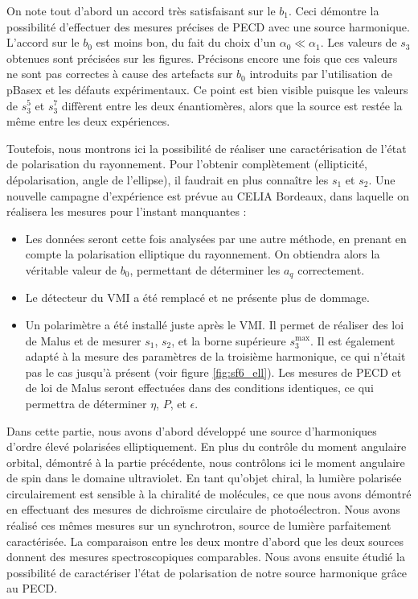 On note tout d'abord un accord très satisfaisant sur le $b_1$. Ceci démontre la possibilité d'effectuer des mesures précises de PECD avec une source harmonique. L'accord sur le $b_0$ est moins bon, du fait du choix d'un $\alpha_0\ll\alpha_1$. Les valeurs de $s_3$ obtenues sont précisées sur les figures. Précisons encore une fois que ces valeurs ne sont pas correctes à cause des artefacts sur $b_0$ introduits par l'utilisation de pBasex et les défauts expérimentaux. Ce point est bien visible puisque les valeurs de $s_3^5$ et $s_3^7$ diffèrent entre les deux énantiomères, alors que la source est restée la même entre les deux expériences.\par
Toutefois, nous montrons ici la possibilité de réaliser une caractérisation de l'état de polarisation du rayonnement. Pour l'obtenir complètement (ellipticité, dépolarisation, angle de l'ellipse), il faudrait en plus connaître les $s_1$ et $s_2$. Une nouvelle campagne d'expérience est prévue au CELIA Bordeaux, dans laquelle on réalisera les mesures pour l'instant manquantes :


\begin{itemize}
\renewcommand{\labelitemi}{$\bullet$}
\setlength\itemsep{1em}
\item Les données seront cette fois analysées par une autre méthode, en prenant en compte la polarisation elliptique du rayonnement. On obtiendra alors la véritable valeur de $b_0$, permettant de déterminer les $a_q$ correctement.
\item Le détecteur du VMI a été remplacé et ne présente plus de dommage.
\item Un polarimètre a été installé juste après le VMI. Il permet de réaliser des loi de Malus et de mesurer $s_1$, $s_2$, et la borne supérieure $s_3^{\text{max}}$. Il est également adapté à la mesure des paramètres de la troisième harmonique, ce qui n'était pas le cas jusqu'à présent (voir figure \ref{fig:sf6_ell}). Les mesures de PECD et de loi de Malus seront effectuées dans des conditions identiques, ce qui permettra de déterminer $\eta$, $P$, et $\epsilon$. 
\end{itemize}

Dans cette partie, nous avons d'abord développé une source d'harmoniques d'ordre élevé polarisées elliptiquement. En plus du contrôle du moment angulaire orbital, démontré à la partie précédente, nous contrôlons ici le moment angulaire de spin dans le domaine ultraviolet. En tant qu'objet chiral, la lumière polarisée circulairement est sensible à la chiralité de molécules, ce que nous avons démontré en effectuant des mesures de dichroïsme circulaire de photoélectron. Nous avons réalisé ces mêmes mesures sur un synchrotron, source de lumière parfaitement caractérisée. La comparaison entre les deux montre d'abord que les deux sources donnent des mesures spectroscopiques comparables. Nous avons ensuite étudié la possibilité de caractériser l'état de polarisation de notre source harmonique grâce au PECD.
